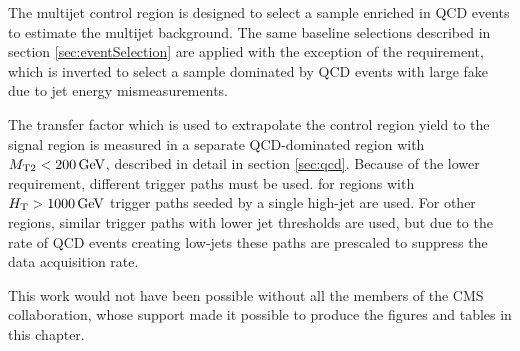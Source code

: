 The multijet control region is designed to select  a sample enriched in QCD events to estimate the multijet background. The same baseline selections described in section \ref{sec:eventSelection} are applied with the exception of the \dphilong requirement, which is inverted to select a sample dominated by QCD events with large fake \MET due to jet energy mismeasurements.

The transfer factor which is used to extrapolate the control region yield to the signal region is measured in a separate QCD-dominated region with $M_{\mathrm{T2}} < 200\,\text{Ge\hspace{-.08em}V}$, described in detail in section \ref{sec:qcd}. Because of the lower \MET requirement, different trigger paths must be used. for regions with $H_{\mathrm{T}} > 1000\,\text{Ge\hspace{-.08em}V}$ trigger paths seeded by a single high-\pt jet are used. For other \HT regions, similar trigger paths with lower jet \pt thresholds are used, but due to the rate of QCD events creating low-\pt jets these paths are prescaled to suppress the data acquisition rate.

This work would not have been possible without all the members of the CMS collaboration, whose support made it possible to produce the figures and tables in this chapter.

